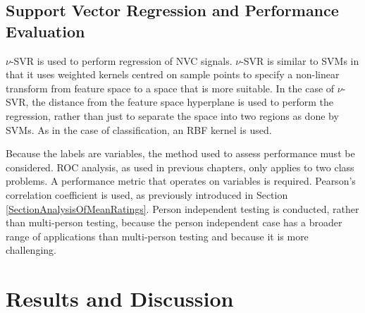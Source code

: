 


\subsection{Support Vector Regression and Performance Evaluation}
\label{SectionRegressionAndPerformanceEvaluation}

$\nu$-SVR \cite{Scholkopf2000} is used to perform regression of \ac{NVC} signals. 
$\nu$-SVR is similar to \ac{SVM}s in that it uses weighted kernels centred on sample points to specify a non-linear transform from feature space to a space that is more suitable. In the case of $\nu$-SVR, the distance from the feature space hyperplane is used to perform the regression, rather than just to separate the space into two regions as done by \ac{SVM}s. As in the case of classification, an \ac{RBF} kernel is used.



Because the labels are \continuous variables, the method used to assess performance must be considered. \ac{ROC} analysis, as used in previous chapters, only applies to two class problems. A performance metric that operates on \continuous variables is required. Pearson's correlation coefficient is used, as previously introduced in Section \ref{SectionAnalysisOfMeanRatings}. %
Person independent testing is conducted, rather than multi-person testing, because the person independent case has a broader range of applications than multi-person testing and because it is more challenging. 

\section{Results and Discussion}
\label{SectionRegressionResultsAndDiscussion}

